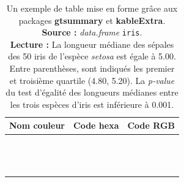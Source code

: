 \documentclass[french,]{compterendu}
\theoremstyle{urcastyle}
\theoremstyle{remark}
\begin{document}
\begin{table}

\caption{\label{tab:couleurs}Un exemple de table mise en forme grâce aux packages \textbf{gtsummary} et \textbf{kableExtra}.\\
\textbf{Source :} \emph{data.frame} \texttt{iris}.\\
\textbf{Lecture :} La longueur médiane des sépales des 50 iris de l'espèce \emph{setosa} est égale à 5.00. Entre parenthèses, sont indiqués les premier et troisième quartile (4.80, 5.20). La \emph{p-value} du test d'égalité des longueurs médianes entre les trois espèces d'iris est inférieure à 0.001.}
\centering
\begin{tabular}[t]{l|l|l}
\hline
\textbf{Nom couleur} & \textbf{Code hexa} & \textbf{Code RGB}\\
\hline
\cellcolor[HTML]{D1AD55}{urcalightbrown} & \cellcolor[HTML]{D1AD55}{\#D1AD55} & \cellcolor[HTML]{D1AD55}{209, 173, 85}\\
\hline
\cellcolor[HTML]{AE7433}{urcamediumbrown} & \cellcolor[HTML]{AE7433}{\#AE7433} & \cellcolor[HTML]{AE7433}{174, 116, 51}\\
\hline
\cellcolor[HTML]{480000}{urcaheavybrown} & \cellcolor[HTML]{480000}{\#480000} & \cellcolor[HTML]{480000}{72, 0, 0}\\
\hline
\cellcolor[HTML]{88C7FA}{urcalightblue} & \cellcolor[HTML]{88C7FA}{\#88C7FA} & \cellcolor[HTML]{88C7FA}{136, 199, 250}\\
\hline
\cellcolor[HTML]{1A9DDD}{urcamediumblue} & \cellcolor[HTML]{1A9DDD}{\#1A9DDD} & \cellcolor[HTML]{1A9DDD}{26, 157, 221}\\
\hline
\cellcolor[HTML]{365A8E}{urcaheavyblue} & \cellcolor[HTML]{365A8E}{\#365A8E} & \cellcolor[HTML]{365A8E}{54, 90, 142}\\
\hline
\cellcolor[HTML]{76bc21}{senolive} & \cellcolor[HTML]{76bc21}{\#76bc21} & \cellcolor[HTML]{76bc21}{118, 188, 33}\\
\hline
\cellcolor[HTML]{007934}{sendarkgreen} & \cellcolor[HTML]{007934}{\#007934} & \cellcolor[HTML]{007934}{0, 121, 52}\\
\hline
\cellcolor[HTML]{00ae42}{senlightgreen} & \cellcolor[HTML]{00ae42}{\#00ae42} & \cellcolor[HTML]{00ae42}{0, 174, 66}\\
\hline
\cellcolor[HTML]{DB6761}{darkpink} & \cellcolor[HTML]{DB6761}{\#DB6761} & \cellcolor[HTML]{DB6761}{219, 103, 97}\\
\hline
\cellcolor[HTML]{D95F02}{clay} & \cellcolor[HTML]{D95F02}{\#D95F02} & \cellcolor[HTML]{D95F02}{217, 95, 2}\\
\hline
\cellcolor[HTML]{FED976}{sand} & \cellcolor[HTML]{FED976}{\#FED976} & \cellcolor[HTML]{FED976}{254, 217, 118}\\
\hline
\cellcolor[HTML]{CD7FC5}{shadedpurple} & \cellcolor[HTML]{CD7FC5}{\#CD7FC5} & \cellcolor[HTML]{CD7FC5}{205, 127, 197}\\
\hline
\end{tabular}
\end{table}
\end{document}
